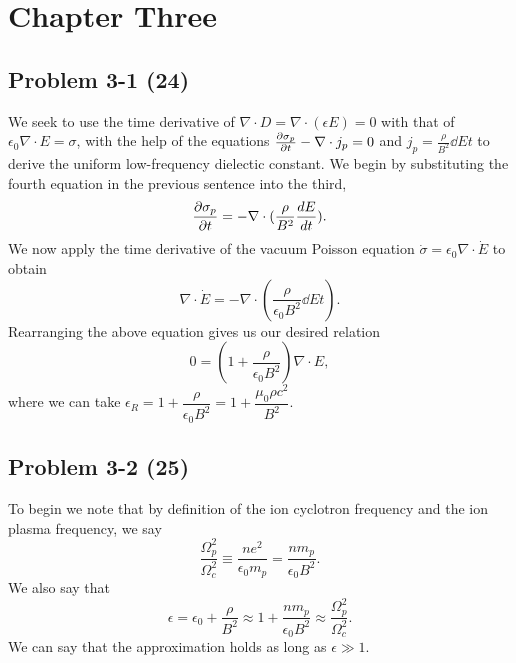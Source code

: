 \chapter*{Chapter Three}
\label{ch:Three}

\section*{Problem 3-1 (24)}
\label{sec:3-1}
We seek to use the time derivative of \(\nabla \cdot D = \nabla \cdot (\epsilon E) = 0 \) with that of \(\epsilon_0\nabla\cdot E= \sigma \), with the help of the equations \(\frac{\partial \sigma_p}{\partial t} -\nabla \cdot j_p = 0 \) and \(j_p = \frac{\rho}{B^2}\dd{E}{t} \) to derive the uniform low-frequency dielectic constant. We begin by substituting the fourth equation in the previous sentence into the third,
\begin{equation*}
	\frac{\partial \sigma_p}{\partial t} = -\nabla\cdot(\dfrac{\rho}{B^2}\frac{d E}{d t}).
\end{equation*}
We now apply the time derivative of the vacuum Poisson equation \(\dot{\sigma} = \epsilon_0\nabla\cdot \dot{E} \) to obtain
\begin{equation*}
	\nabla\cdot \dot{E} = -\nabla\cdot(\dfrac{\rho}{\epsilon_0B^2}\dd{E}{t}).
\end{equation*}
Rearranging the above equation gives us our desired relation
\begin{equation*}
	0 = (1 + \dfrac{\rho}{\epsilon_0B^2})\nabla \cdot E, 
\end{equation*}
where we can take \(\epsilon_R = 1 + \dfrac{\rho}{\epsilon_0B^2} = 1 + \dfrac{\mu_0\rho c^2}{B^2} \).

\section*{Problem 3-2 (25)}
\label{sec:3-2}
To begin we note that by definition of the ion cyclotron frequency and the ion plasma frequency, we say
\begin{equation*}
	\dfrac{\Omega_p^2}{\Omega_c^2} \equiv \dfrac{ne^2}{\epsilon_0m_p} = \dfrac{nm_p}{\epsilon_0B^2}.
\end{equation*}
We also say that 
\begin{equation*}
	\epsilon = \epsilon_0 + \dfrac{\rho}{B^2} \approx 1 + \dfrac{nm_p}{\epsilon_0B^2} \approx \dfrac{\Omega_p^2}{\Omega_c^2}.
\end{equation*}
We can say that the approximation holds as long as \(\epsilon \gg 1 \).

